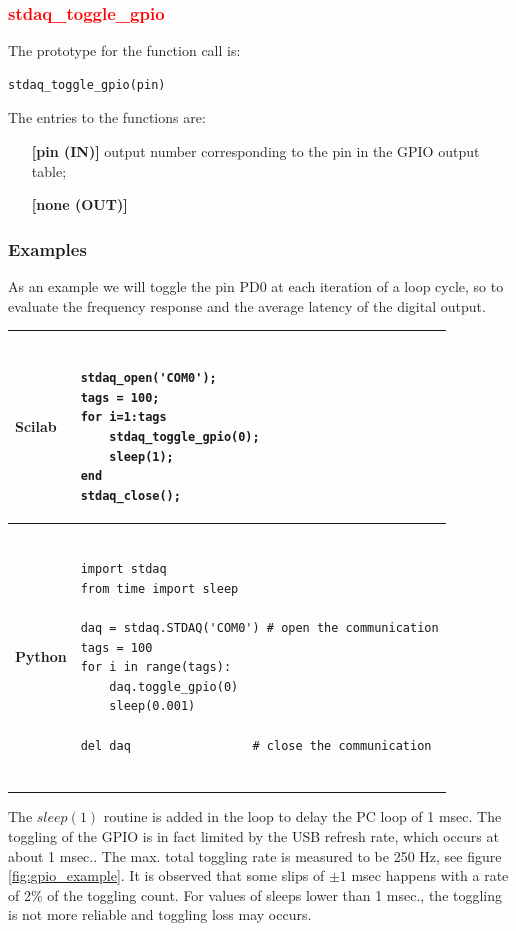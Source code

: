 \documentclass[letterpaper,10pt,english]{hitec}
\begin{document}
\subsubsection{\textcolor{red}{stdaq\_toggle\_gpio}}
The prototype for the function call is: 
\begin{verbatim}
stdaq_toggle_gpio(pin)
\end{verbatim}
The entries to the functions are:
\begin{itemize}
\item [\textbf{[pin (IN)]}] output number corresponding to the pin in the GPIO output table;
\item [\textbf{[none (OUT)]}]
\end{itemize}

\subsubsection{Examples}

As an example we will toggle the pin PD0 at each iteration of a loop cycle, so to evaluate the frequency response and the average latency of the digital output.
%
\begin{table}[ht!]
\begin{tabular}{|l|l|}
\hline
\cellcolor[HTML]{C0C0C0} \textbf{Scilab} & 
\begin{minipage}{4.5in}
\begin{verbatim}

stdaq_open('COM0');
tags = 100;
for i=1:tags
    stdaq_toggle_gpio(0);
    sleep(1);
end
stdaq_close();

\end{verbatim}
\end{minipage}
\\ \hline
\cellcolor[HTML]{C0C0C0} \textbf{Python} & 
\begin{minipage}{4.5in}
\begin{verbatim}

import stdaq
from time import sleep

daq = stdaq.STDAQ('COM0') # open the communication
tags = 100
for i in range(tags):
    daq.toggle_gpio(0)
    sleep(0.001)

del daq                 # close the communication
    
\end{verbatim}
\end{minipage}
\\ \hline
\end{tabular}
\end{table}
%
The $sleep(1)$ routine is added in the loop to delay the PC loop of 1 msec. 
The toggling of the GPIO is in fact limited by the USB refresh rate, which occurs at about 1 msec..
The max. total toggling rate is measured to be 250 Hz, see figure \ref{fig:gpio_example}. It is observed that some slips of $\pm 1$ msec happens with a rate of 2\% of the toggling count. 
For values of sleeps lower than 1 msec., the toggling is not more reliable and toggling loss may occurs.
\end{document}
